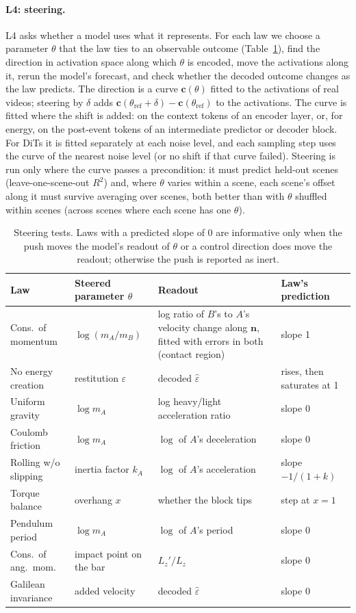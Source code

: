 \documentclass[10pt]{article}
\newcommand{\eps}{\varepsilon}
\begin{document}
\paragraph{L4: steering.}
L4 asks whether a model uses what it represents. For each law we choose a parameter $\theta$ that the law ties to an
observable outcome (Table~\ref{tab:steer}), find the direction in activation space along which $\theta$ is encoded,
move the activations along it, rerun the model's forecast, and check whether the decoded outcome changes as the law
predicts. The direction is a curve $\mathbf c(\theta)$ fitted to the activations of real videos; steering by $\delta$
adds $\mathbf c(\theta_{\mathrm{ref}}+\delta)-\mathbf c(\theta_{\mathrm{ref}})$ to the activations. The curve is fitted
where the shift is added: on the context tokens of an encoder layer, or, for energy, on the post-event tokens of an
intermediate predictor or decoder block. For DiTs it is fitted separately at each noise level, and each sampling step
uses the curve of the nearest noise level (or no shift if that curve failed). Steering is run only where the curve
passes a precondition: it must predict held-out scenes (leave-one-scene-out $R^2$) and, where $\theta$ varies within a
scene, each scene's offset along it must survive averaging over scenes, both better than with $\theta$ shuffled
within scenes (across scenes where each scene has one $\theta$).

\begin{table}[h]
\centering\small
\begin{tabularx}{\linewidth}{@{}l>{\raggedright\arraybackslash}p{3.3cm}>{\raggedright\arraybackslash}p{3.6cm}>{\raggedright\arraybackslash}X@{}}
\toprule
Law & Steered parameter $\theta$ & Readout & Law's prediction \\
\midrule
Cons.\ of momentum & $\log(m_A/m_B)$ & log ratio of $B$'s to $A$'s velocity change along $\mathbf n$, fitted with errors in both (contact region) & slope 1 \\
No energy creation & restitution $\eps$ & decoded $\hat\eps$ & rises, then saturates at 1 \\
Uniform gravity & $\log m_A$ & log heavy/light acceleration ratio & slope 0 \\
Coulomb friction & $\log m_A$ & $\log$ of $A$'s deceleration & slope 0 \\
Rolling w/o slipping & inertia factor $k_A$ & $\log$ of $A$'s acceleration & slope $-1/(1+k)$ \\
Torque balance & overhang $x$ & whether the block tips & step at $x=1$ \\
Pendulum period & $\log m_A$ & $\log$ of $A$'s period & slope 0 \\
Cons.\ of ang.\ mom. & impact point on the bar & $L_z'/L_z$ & slope 0 \\
Galilean invariance & added velocity & decoded $\hat\eps$ & slope 0 \\
\bottomrule
\end{tabularx}
\caption{Steering tests. Laws with a predicted slope of $0$ are informative only when the push moves the model's
readout of $\theta$ or a control direction does move the readout; otherwise the push is reported as inert.}
\label{tab:steer}
\end{table}
\end{document}
